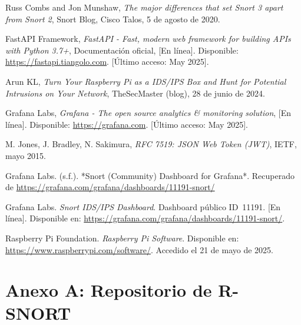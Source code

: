 \documentclass[11pt,a4paper,twoside]{report}
\begin{document}
\begin{thebibliography}{99}
	 Russ Combs and Jon Munshaw, \emph{The major differences that set Snort 3 apart from Snort 2}, Snort Blog, Cisco Talos, 5 de agosto de 2020.
	
	 FastAPI Framework, \emph{FastAPI - Fast, modern web framework for building APIs with Python 3.7+}, Documentación oficial, [En línea]. Disponible: \url{https://fastapi.tiangolo.com}. [Último acceso: May 2025].
	
	 Arun KL, \emph{Turn Your Raspberry Pi as a IDS/IPS Box and Hunt for Potential Intrusions on Your Network}, TheSecMaster (blog), 28 de junio de 2024.
	
	 Grafana Labs, \emph{Grafana - The open source analytics \& monitoring solution}, [En línea]. Disponible: \url{https://grafana.com}. [Último acceso: May 2025].
	
	 M. Jones, J. Bradley, N. Sakimura, \emph{RFC 7519: JSON Web Token (JWT)}, IETF, mayo 2015.
	
	Grafana Labs. (s.f.). *Snort (Community) Dashboard for Grafana*. Recuperado de \url{https://grafana.com/grafana/dashboards/11191-snort/}
	
	 Grafana Labs. \emph{Snort IDS/IPS Dashboard}. Dashboard público ID~11191. [En línea]. Disponible en: \url{https://grafana.com/grafana/dashboards/11191-snort/}.
	
	Raspberry Pi Foundation. \textit{Raspberry Pi Software}. Disponible en: \url{https://www.raspberrypi.com/software/}. Accedido el 21 de mayo de 2025.
	
\end{thebibliography}

\appendix
\chapter{Anexo A: Repositorio de R-SNORT}


%
\end{document}
